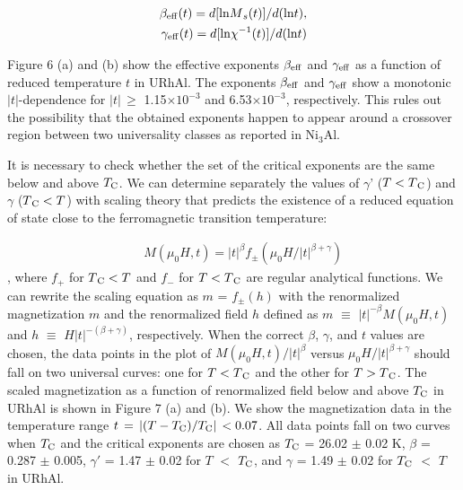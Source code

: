\documentclass[twocolumn,showpacs,preprintnumbers,amsmath,amssymb]{revtex4}
\begin{document}
   \begin{eqnarray}
{{\beta}_{\rm eff}} (t) =  d[{\rm ln}M{_s}(t)]/d({{\rm ln}{t}}),\\{{\gamma}_{\rm eff}} (t) =  d[{\rm ln}{{\chi}^{-1}}(t)]/d({{\rm ln}{t}})
   \end{eqnarray}

Figure 6 (a) and (b) show the effective exponents ${\beta}_{\rm eff}$ and ${\gamma}_{\rm eff}$ as a function of reduced temperature $t$ in URhAl. The exponents ${\beta}_{\rm eff}$ and ${\gamma}_{\rm eff}$ show a monotonic $|t|$-dependence for ${|t|}{\,}{\geq}$ 1.15${\times}{10^{-3}}$ and 6.53${\times}{10^{-3}}$, respectively. This rules out the possibility that the obtained exponents happen to appear around a crossover region between two universality classes as reported in Ni$_3$Al\cite{semwal}.
 
 It is necessary to check whether the set of the critical exponents are the same below and above $T_{\rm C}$. We can determine separately the values of ${\gamma}$' ($T<T{_{\rm C}}$) and $\gamma$ ($T{_{\rm C}}<T$) with scaling theory that predicts the existence of a reduced equation of state close to the ferromagnetic transition temperature\cite{privman}: 

    \begin{eqnarray}
  &&M({{\mu}_0}H, t) = {|t|^{\beta}} f{_{\pm}}({{\mu}_0}H/|t|^{{\beta}+{\gamma}})
   \end{eqnarray}
, where $f_{+}$ for $T{_{\rm C}} < T$ and $f_{-}$ for $T < T{_{\rm C}}$ are regular analytical functions. We can rewrite the scaling equation as $m$ = $f{_{\pm}}{(h)}$ with the renormalized magnetization $m$ and the renormalized field $h$ defined as $m$ $\equiv$ ${|t|^{-{\beta}}}{M({{\mu}_0}H, t)}$ and $h$ $\equiv$ ${H}{|t|^{-({\beta}+{\gamma})}}$, respectively. When the correct $\beta$, $\gamma$, and $t$ values are chosen, the data points in the plot of $M({{\mu}_0}H, t)/{|t|^{\beta}}$ versus ${{\mu}_0}H/|t|^{{\beta}+{\gamma}}$ should fall on two universal curves: one for $T < T{_{\rm C}}$ and the other for $T > T{_{\rm C}}$. The scaled magnetization as a function of renormalized field below and above $T_{\rm C}$ in URhAl is shown in Figure 7 (a) and (b). We show the magnetization data in the temperature range $t{\,}={\,}|({T}-{T_{\rm C}})/{T_{\rm C}}|{\,}< 0.07$. All data points fall on two curves when $T_{\rm C}$ and the critical exponents are chosen as $T_{\rm C}$ = 26.02 $\pm$ 0.02 K, $\beta$ = 0.287 $\pm$ 0.005, ${\gamma}'$ = 1.47 $\pm$ 0.02 for $T$ $<$ $T_{\rm C}$, and $\gamma$ = 1.49 $\pm$ 0.02 for $T_{\rm C}$ $<$ $T$ in URhAl. 
\end{document}
